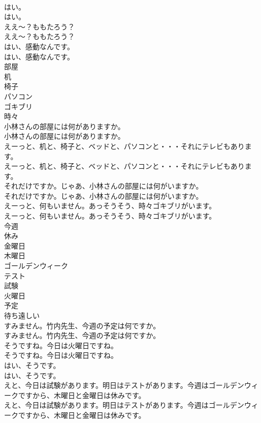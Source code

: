 \documentclass[8pt]{extreport}
\begin{document}
\begin{CJK}{UTF8}{min}
\\	はい。	
\\	はい。 
\\	ええ～？ももたろう？	
\\	ええ～？ももたろう？ 
\\	はい、感動なんです。	
\\	はい、感動なんです。 
\\	部屋
\\	机
\\	椅子
\\	パソコン
\\	ゴキブリ
\\	時々
\\	小林さんの部屋には何がありますか。	
\\	小林さんの部屋には何がありますか。 
\\	えーっと、机と、椅子と、ベッドと、パソコンと・・・それにテレビもあります。	
\\	えーっと、机と、椅子と、ベッドと、パソコンと・・・それにテレビもあります。 
\\	それだけですか。じゃあ、小林さんの部屋には何がいますか。	
\\	それだけですか。じゃあ、小林さんの部屋には何がいますか。 
\\	えーっと、何もいません。あっそうそう、時々ゴキブリがいます。	
\\	えーっと、何もいません。あっそうそう、時々ゴキブリがいます。 
\\	今週
\\	休み
\\	金曜日
\\	木曜日
\\	ゴールデンウィーク
\\	テスト
\\	試験
\\	火曜日
\\	予定
\\	待ち遠しい
\\	すみません。竹内先生、今週の予定は何ですか。	
\\	すみません。竹内先生、今週の予定は何ですか。 
\\	そうですね。今日は火曜日ですね。	
\\	そうですね。今日は火曜日ですね。 
\\	はい、そうです。	
\\	はい、そうです。 
\\	えと、今日は試験があります。明日はテストがあります。今週はゴールデンウィークですから、木曜日と金曜日は休みです。	
\\	えと、今日は試験があります。明日はテストがあります。今週はゴールデンウィークですから、木曜日と金曜日は休みです。 

\end{CJK}
\end{document}
